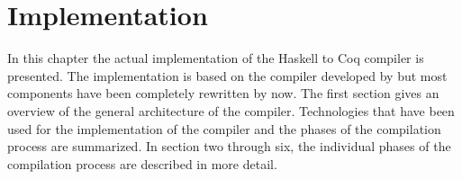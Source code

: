\chapter{Implementation} \label{chp:implementation}
In this chapter the actual implementation of the Haskell to Coq compiler is presented.
The implementation is based on the compiler developed by \cite{Jessen:2019} but most components have been completely rewritten by now.
The first section gives an overview of the general architecture of the compiler.
Technologies that have been used for the implementation of the compiler and the phases of the compilation process are summarized.
In section two through six, the individual phases of the compilation process are described in more detail.









